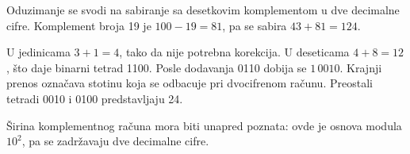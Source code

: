 Oduzimanje se svodi na sabiranje sa desetkovim komplementom u dve decimalne cifre. Komplement broja 19 je $100-19=81$, pa se sabira $43+81=124$.

U jedinicama $3+1=4$, tako da nije potrebna korekcija. U deseticama $4+8=12$, što daje binarni tetrad 1100. Posle dodavanja 0110 dobija se $1\,0010$. Krajnji prenos označava stotinu koja se odbacuje pri dvocifrenom računu. Preostali tetradi 0010 i 0100 predstavljaju 24.

Širina komplementnog računa mora biti unapred poznata: ovde je osnova modula $10^2$, pa se zadržavaju dve decimalne cifre.
